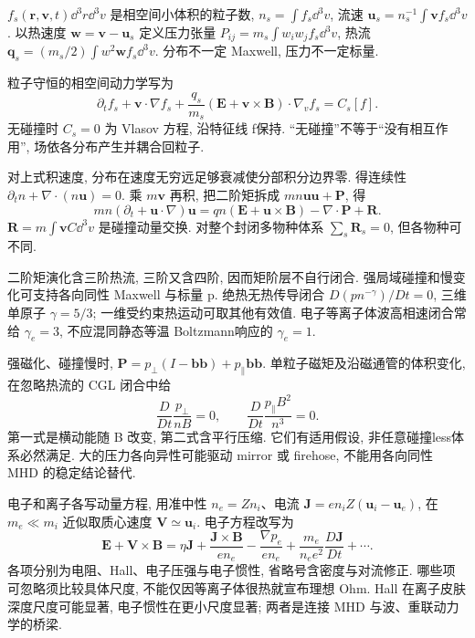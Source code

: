 \label{ch:moments}
$f_s(\mathbf r,\mathbf v,t)\dd^3r\dd^3v$ 是相空间小体积的粒子数, $n_s=\int f_s\dd^3v$, 流速 $\mathbf u_s=n_s^{-1}\int\mathbf vf_s\dd^3v$. 以热速度 $\mathbf w=\mathbf v-\mathbf u_s$ 定义压力张量 $P_{ij}=m_s\int w_iw_jf_s\dd^3v$, 热流 $\mathbf q_s=(m_s/2)\int w^2\mathbf wf_s\dd^3v$. 分布不一定 Maxwell, 压力不一定标量.

粒子守恒的相空间动力学写为
\begin{equation}
 \partial_tf_s+\mathbf v\cdot\nabla f_s+\frac{q_s}{m_s}(\mathbf E+\mathbf v\times\mathbf B)\cdot\nabla_vf_s=C_s[f].
\end{equation}
无碰撞时 $C_s=0$ 为 Vlasov 方程, 沿特征线 f保持. ``无碰撞''不等于``没有相互作用'', 场依各分布产生并耦合回粒子.

对上式积速度, 分布在速度无穷远足够衰减使分部积分边界零. 得连续性 $\partial_tn+\nabla\cdot(n\mathbf u)=0$. 乘 $m\mathbf v$ 再积, 把二阶矩拆成 $mn\mathbf u\mathbf u+\mathbf P$, 得
\begin{equation}
 mn(\partial_t+\mathbf u\cdot\nabla)\mathbf u
 =qn(\mathbf E+\mathbf u\times\mathbf B)-\nabla\cdot\mathbf P+\mathbf R.
\end{equation}
$\mathbf R=m\int\mathbf vC\dd^3v$ 是碰撞动量交换. 对整个封闭多物种体系 $\sum_s\mathbf R_s=0$, 但各物种可不同.

二阶矩演化含三阶热流, 三阶又含四阶, 因而矩阶层不自行闭合. 强局域碰撞和慢变化可支持各向同性 Maxwell 与标量 p. 绝热无热传导闭合 $D(pn^{-\gamma})/Dt=0$, 三维单原子 $\gamma=5/3$; 一维受约束热运动可取其他有效值. 电子等离子体波高相速闭合常给 $\gamma_e=3$, 不应混同静态等温 Boltzmann响应的 $\gamma_e=1$.

强磁化、碰撞慢时, $\mathbf P=p_\perp(I-\mathbf b\mathbf b)+p_\parallel\mathbf b\mathbf b$. 单粒子磁矩及沿磁通管的体积变化, 在忽略热流的 CGL 闭合中给
\begin{equation}
 \frac{D}{Dt}\frac{p_\perp}{nB}=0,\qquad
 \frac{D}{Dt}\frac{p_\parallel B^2}{n^3}=0.
\end{equation}
第一式是横动能随 B 改变, 第二式含平行压缩. 它们有适用假设, 非任意碰撞less体系必然满足. 大的压力各向异性可能驱动 mirror 或 firehose, 不能用各向同性 MHD 的稳定结论替代.

电子和离子各写动量方程, 用准中性 $n_e=Zn_i$、电流 $\mathbf J=en_iZ(\mathbf u_i-\mathbf u_e)$, 在 $m_e\ll m_i$ 近似取质心速度 $\mathbf V\simeq\mathbf u_i$. 电子方程改写为
\begin{equation}\label{eq:ohm-general}
 \mathbf E+\mathbf V\times\mathbf B=\eta\mathbf J+\frac{\mathbf J\times\mathbf B}{en_e}
 -\frac{\nabla p_e}{en_e}+\frac{m_e}{n_ee^2}\frac{D\mathbf J}{Dt}+\cdots.
\end{equation}
各项分别为电阻、Hall、电子压强与电子惯性, 省略号含密度与对流修正. 哪些项可忽略须比较具体尺度, 不能仅因等离子体很热就宣布理想 Ohm. Hall 在离子皮肤深度尺度可能显著, 电子惯性在更小尺度显著; 两者是连接 MHD 与波、重联动力学的桥梁.
